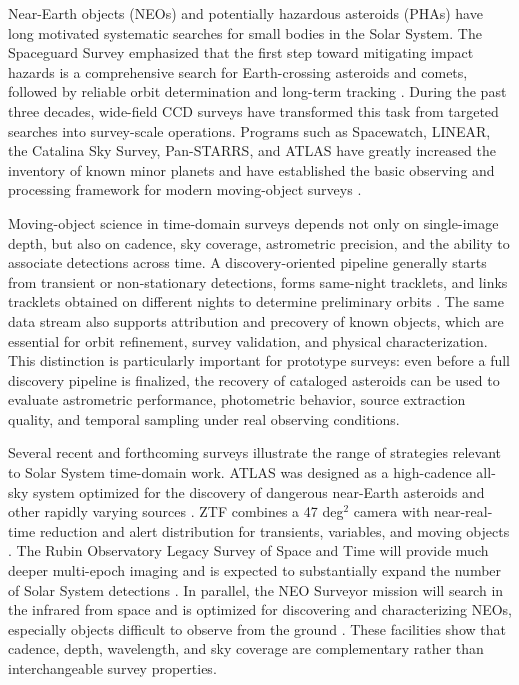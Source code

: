 \documentclass[referee]{raa}
\begin{document}
Near-Earth objects (NEOs) and potentially hazardous asteroids (PHAs) have long motivated systematic searches for small bodies in the Solar System. The Spaceguard Survey emphasized that the first step toward mitigating impact hazards is a comprehensive search for Earth-crossing asteroids and comets, followed by reliable orbit determination and long-term tracking \citep{Morrison1992}. During the past three decades, wide-field CCD surveys have transformed this task from targeted searches into survey-scale operations. Programs such as Spacewatch, LINEAR, the Catalina Sky Survey, Pan-STARRS, and ATLAS have greatly increased the inventory of known minor planets and have established the basic observing and processing framework for modern moving-object surveys \citep[e.g.][]{Stokes2000,Larsen2007,Larson2003,Denneau2013,Tonry2018}.

Moving-object science in time-domain surveys depends not only on single-image depth, but also on cadence, sky coverage, astrometric precision, and the ability to associate detections across time. A discovery-oriented pipeline generally starts from transient or non-stationary detections, forms same-night tracklets, and links tracklets obtained on different nights to determine preliminary orbits \citep{Kubica2007,Denneau2013,Veres2017}. The same data stream also supports attribution and precovery of known objects, which are essential for orbit refinement, survey validation, and physical characterization. This distinction is particularly important for prototype surveys: even before a full discovery pipeline is finalized, the recovery of cataloged asteroids can be used to evaluate astrometric performance, photometric behavior, source extraction quality, and temporal sampling under real observing conditions.

Several recent and forthcoming surveys illustrate the range of strategies relevant to Solar System time-domain work. ATLAS was designed as a high-cadence all-sky system optimized for the discovery of dangerous near-Earth asteroids and other rapidly varying sources \citep{Tonry2018}. ZTF combines a 47 deg$^2$ camera with near-real-time reduction and alert distribution for transients, variables, and moving objects \citep{Bellm2019,Patterson2019}. The Rubin Observatory Legacy Survey of Space and Time will provide much deeper multi-epoch imaging and is expected to substantially expand the number of Solar System detections \citep{Ivezic2019,Jones2018,Schwamb2023}. In parallel, the NEO Surveyor mission will search in the infrared from space and is optimized for discovering and characterizing NEOs, especially objects difficult to observe from the ground \citep{Mainzer2023}. These facilities show that cadence, depth, wavelength, and sky coverage are complementary rather than interchangeable survey properties.
\end{document}
